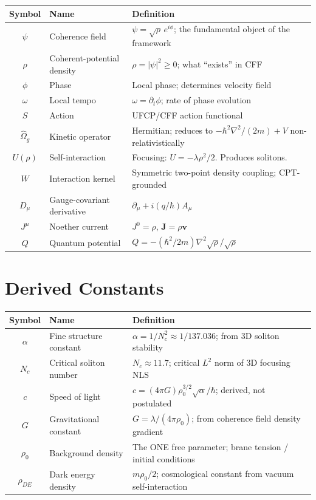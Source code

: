 \documentclass[11pt, a4paper]{article}
\begin{document}
\begin{center}
\begin{longtable}{@{}clp{7cm}@{}}
\toprule
\textbf{Symbol} & \textbf{Name} & \textbf{Definition} \\
\midrule
\endhead
$\psi$ & Coherence field & $\psi = \sqrt{\rho}\,e^{i\phi}$;
  the fundamental object of the framework \\
$\rho$ & Coherent-potential density & $\rho = |\psi|^2 \geq 0$;
  what ``exists'' in CFF \\
$\phi$ & Phase & Local phase; determines velocity field \\
$\omega$ & Local tempo & $\omega = \partial_t\phi$; rate of
  phase evolution \\
$S$ & Action & UFCP/CFF action functional \\
$\hat{\Omega}_g$ & Kinetic operator & Hermitian; reduces to
  $-\hbar^2\nabla^2/(2m) + V$ non-relativistically \\
$U(\rho)$ & Self-interaction & Focusing:
  $U = -\lambda\rho^2/2$. Produces solitons. \\
$W$ & Interaction kernel & Symmetric two-point density coupling;
  CPT-grounded \\
$D_\mu$ & Gauge-covariant derivative &
  $\partial_\mu + i(q/\hbar)A_\mu$ \\
$J^\mu$ & Noether current & $J^0 = \rho$,
  $\mathbf{J} = \rho\mathbf{v}$ \\
$Q$ & Quantum potential & $Q = -(\hbar^2/2m)\nabla^2\sqrt{\rho}/\sqrt{\rho}$ \\
\bottomrule
\end{longtable}
\end{center}

\section{Derived Constants}

\begin{center}
\begin{longtable}{@{}clp{7cm}@{}}
\toprule
\textbf{Symbol} & \textbf{Name} & \textbf{Definition} \\
\midrule
\endhead
$\alpha$ & Fine structure constant & $\alpha = 1/N_c^2 \approx
  1/137.036$; from 3D soliton stability \\
$N_c$ & Critical soliton number & $N_c \approx 11.7$; critical
  $L^2$ norm of 3D focusing NLS \\
$c$ & Speed of light & $c = (4\pi G)\rho_0^{3/2}\sqrt{\alpha}/\hbar$;
  derived, not postulated \\
$G$ & Gravitational constant & $G = \lambda/(4\pi\rho_0)$; from
  coherence field density gradient \\
$\rho_0$ & Background density & The ONE free parameter; brane
  tension / initial conditions \\
$\rho_{DE}$ & Dark energy density & $m\rho_0/2$; cosmological
  constant from vacuum self-interaction \\
\bottomrule
\end{longtable}
\end{center}
\end{document}
